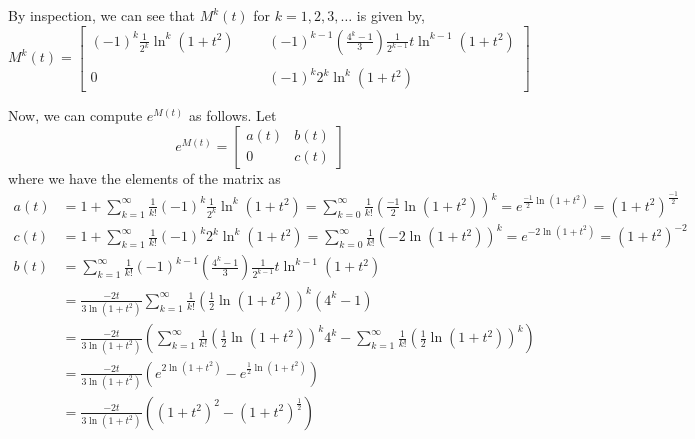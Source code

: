 By inspection, we can see that \( M^{k} (t) \) for \( k = 1, 2, 3, \ldots \) is given by,
\begin{equation*}
    M^{k} (t)
    =
    \begin{bmatrix}
        \displaystyle
        {(-1)}^{k} \frac{1}{2^k} \ln^{k}(1+t^2)
         &  &  &
        \displaystyle
        {(-1)}^{k-1} \left( \frac{4^k-1}{3} \right) \frac{1}{2^{k-1}} t \ln^{k-1}(1+t^2)
        \\ \\
        0
         &  &  &
        \displaystyle
        {(-1)}^{k} 2^{k} \ln^{k}(1+t^2)
    \end{bmatrix}
\end{equation*}

\clearpage
Now, we can compute \( e^{M(t)} \) as follows.
Let
\begin{equation*}
    e^{M(t)}
    =
    \begin{bmatrix}
        a(t) & b(t) \\
        0    & c(t)
    \end{bmatrix}
\end{equation*}
where we have the elements of the matrix as
\begin{align*}
    a(t)
     & =
    1 + \sum_{k=1}^{\infty} \frac{1}{k!} {(-1)}^{k} \frac{1}{2^k} \ln^{k}(1+t^2)
    =
    \sum_{k=0}^{\infty} \frac{1}{k!} {\left( \frac{-1}{2} \ln(1+t^2) \right)}^{k}
    =
    e^{\frac{-1}{2} \ln(1+t^2)}
        =
        {(1+t^2)}^{\frac{-1}{2}}
    \\
    c(t)
     & =
    1 + \sum_{k=1}^{\infty} \frac{1}{k!} {(-1)}^{k} 2^{k} \ln^{k}(1+t^2)
    =
    \sum_{k=0}^{\infty} \frac{1}{k!} {(-2 \ln(1+t^2))}^{k}
    =
    e^{-2 \ln(1+t^2)}
        =
        {(1+t^2)}^{-2}
    \\
    b(t)
     & =
    \sum_{k=1}^{\infty} \frac{1}{k!} {(-1)}^{k-1} \left( \frac{4^k-1}{3} \right) \frac{1}{2^{k-1}} t \ln^{k-1}(1+t^2)
    \\ & =
    \frac{-2t}{3\ln(1+t^2)} \sum_{k=1}^{\infty} \frac{1}{k!} {\left( \frac{1}{2} \ln(1+t^2) \right)}^{k} (4^k - 1)
    \\ & =
    \frac{-2t}{3\ln(1+t^2)} \left(
    \sum_{k=1}^{\infty} \frac{1}{k!} {\left( \frac{1}{2} \ln(1+t^2) \right)}^{k} 4^k
    -
    \sum_{k=1}^{\infty} \frac{1}{k!} {\left( \frac{1}{2} \ln(1+t^2) \right)}^{k}
    \right)
    \\ & =
    \frac{-2t}{3\ln(1+t^2)} \left(
    e^{2 \ln(1+t^2)}
    -
    e^{\frac{1}{2} \ln(1+t^2)}
    \right)
    \\ & =
    \frac{-2t}{3\ln(1+t^2)} \left(
    {(1+t^2)}^{2}
    -
    {(1+t^2)}^{\frac{1}{2}}
    \right)
\end{align*}


